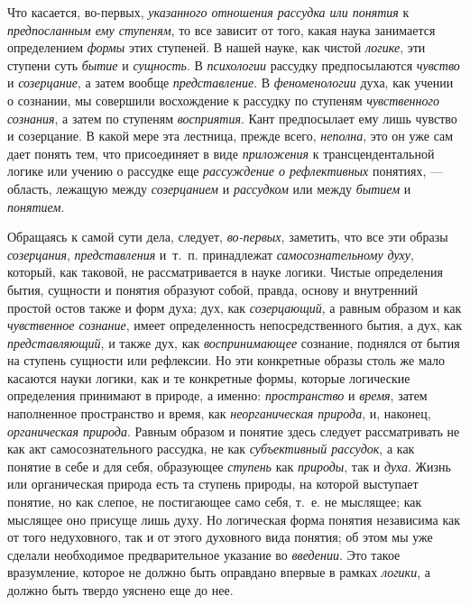 \documentclass[twoside]{article}
\begin{document}
{{Что касается, во-первых,
{\em указанного отношения рассудка или
понятия} к
{\em предпосланным ему ступеням},
то все зависит от того, какая наука занимается определением
{\em формы} этих
ступеней. В нашей науке, как чистой
{\em логике}, эти ступени
суть {\em бытие} и
{\em сущность}. В
{\em психологии} рассудку
предпосылаются {\em чувство}
и {\em созерцание},
а затем вообще
{\em представление}. В
{\em феноменологии} духа,
как учении о сознании, мы совершили восхождение к рассудку
по ступеням {\em чувственного
сознания}, а затем по ступеням
{\em восприятия}. Кант
предпосылает ему лишь чувство и созерцание. В какой мере эта лестница,
прежде всего, {\em неполна},
это он уже сам дает понять тем, что присоединяет в виде
{\em приложения} к
трансцендентальной логике или учению о рассудке еще
{\em рассуждение о рефлективных}
понятиях, — область, лежащую между
{\em созерцанием} и
{\em рассудком} или между
{\em бытием} и
{\em понятием}.

Обращаясь к самой сути дела, следует,
{\em во-первых},
заметить, что все эти образы
{\em созерцания},
{\em представления}
и~т.~п. принадлежат
{\em самосознательному духу},
который, как таковой, не рассматривается в науке логики.
Чистые определения бытия, сущности и понятия образуют собой, правда, основу
и внутренний простой остов также и форм духа; дух, как
{\em созерцающий}, а
равным образом и как {\em чувственное
сознание}, имеет определенность непосредственного бытия, а
дух, как {\em представляющий},
и также дух, как
{\em воспринимающее}
сознание, поднялся от бытия на ступень сущности или
рефлексии. Но эти конкретные образы столь же мало касаются науки логики,
как и те конкретные формы, которые логические определения принимают в
природе, а именно: {\em пространство}
и {\em время},
затем наполненное пространство и время, как
{\em неорганическая природа},
и, наконец,
{\em органическая природа}.
Равным образом и понятие здесь следует рассматривать не как
акт самосознательного рассудка, не как
{\em субъективный рассудок},
а как понятие в себе и для себя, образующее
{\em ступень} как
{\em природы}, так и
{\em духа}. Жизнь или
органическая природа есть та ступень природы, на которой выступает понятие,
но как слепое, не постигающее само себя, т.~е. не мыслящее; как мыслящее
оно присуще лишь духу. Но логическая форма понятия независима как от того
недуховного, так и от этого духовного вида понятия; об этом мы уже сделали
необходимое предварительное указание во
{\em введении}. Это такое
вразумление, которое не должно быть оправдано впервые в рамках
{\em логики}, а должно
быть твердо уяснено еще до нее.

}}
\end{document}
